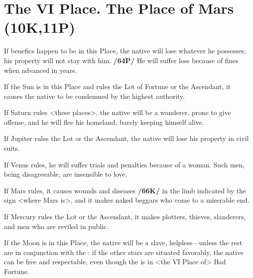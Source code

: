 \section{The VI Place. The Place of Mars (10K,11P)}
If benefics happen to be in this Place, the native will lose whatever he possesses; his property will not stay with him. \textbf{/64P/} He will suffer loss because of fines when advanced in years. 

If the Sun is in this Place and rules the Lot of Fortune or the Ascendant, it causes the native to be condemned by the highest authority. 

If Saturn rules <these places>, the native will be a wanderer, prone to give offense, and he will flee his homeland, barely keeping himself alive. 

If Jupiter rules the Lot or the Ascendant, the native will lose his property in civil suits. 

If Venus rules, he will suffer trials and penalties because of a woman. Such men, being disagreeable, are insensible to love. 

If Mars rules, it causes wounds and diseases \textbf{/66K/} in the limb indicated by the sign <where Mars is>, and it makes naked beggars who come to a miserable end. 

If Mercury rules the Lot or the Ascendant, it makes plotters, thieves, slanderers, and men who are reviled in public. 

If the Moon is in this Place, the native will be a slave, helpless—unless the rest are in conjunction with the \Moon: if the other stars are situated favorably, the native can be free and respectable, even though the \Moon\xspace is in <the VI Place of> Bad Fortune.

\newpage